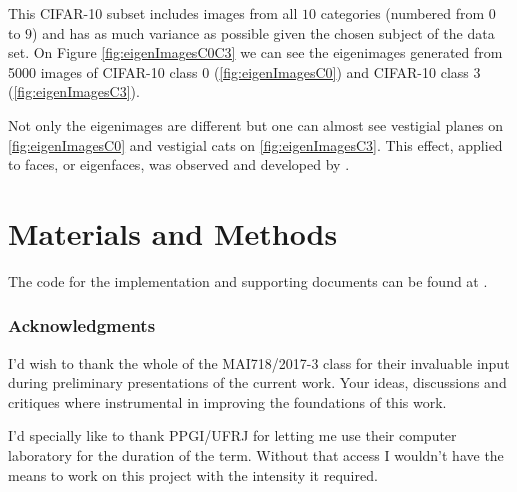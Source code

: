 \documentclass{article} %
\begin{document}
This CIFAR-10 subset includes images from all $10$ categories (numbered from $0$ to $9$) and has as much variance as possible given the chosen subject of the data set. On Figure \ref{fig:eigenImagesC0C3} we can see the eigenimages generated from 5000 images of CIFAR-10 class 0 (\ref{fig:eigenImagesC0}) and CIFAR-10 class 3 (\ref{fig:eigenImagesC3}).\par Not only the eigenimages are different but one can almost see vestigial planes on \ref{fig:eigenImagesC0} and vestigial cats on \ref{fig:eigenImagesC3}.
This effect, applied to faces, or eigenfaces, was observed and developed by \citet{sirovich1987low}.

\section{Materials and Methods}\label{materials}
The code for the implementation and supporting documents can be found at \citet{Stelling:aa}.

\subsubsection*{Acknowledgments}
I'd wish to thank the whole of the MAI718/2017-3 class for their invaluable input during preliminary presentations of the current work. Your ideas, discussions and critiques where instrumental in improving the foundations of this work. 

I'd specially like to thank PPGI/UFRJ for letting me use their computer laboratory for the duration of the term. Without that access I wouldn't have the means to work on this project with the intensity it required.



\end{document}
